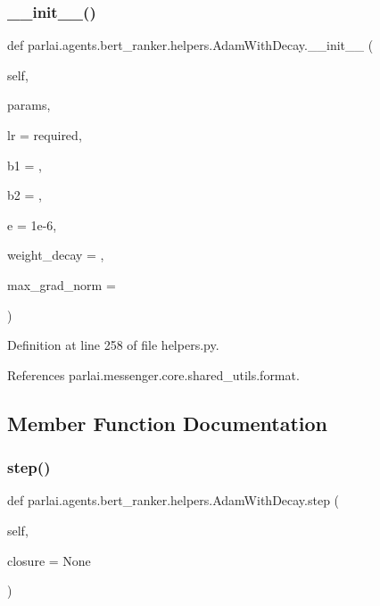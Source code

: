 \subsubsection{\texorpdfstring{\+\_\+\+\_\+init\+\_\+\+\_\+()}{\_\_init\_\_()}}
{\footnotesize\ttfamily def parlai.\+agents.\+bert\+\_\+ranker.\+helpers.\+Adam\+With\+Decay.\+\_\+\+\_\+init\+\_\+\+\_\+ (\begin{DoxyParamCaption}\item[{}]{self,  }\item[{}]{params,  }\item[{}]{lr = {\ttfamily required},  }\item[{}]{b1 = {},  }\item[{}]{b2 = {},  }\item[{}]{e = {\ttfamily 1e-\/6},  }\item[{}]{weight\+\_\+decay = {},  }\item[{}]{max\+\_\+grad\+\_\+norm = {} }\end{DoxyParamCaption})}



Definition at line 258 of file helpers.\+py.



References parlai.\+messenger.\+core.\+shared\+\_\+utils.\+format.



\subsection{Member Function Documentation}
\mbox{\label{classparlai_1_1agents_1_1bert__ranker_1_1helpers_1_1AdamWithDecay_aeb41188377c1a61b4638228abd6c3e64}} 
\subsubsection{\texorpdfstring{step()}{step()}}
{\footnotesize\ttfamily def parlai.\+agents.\+bert\+\_\+ranker.\+helpers.\+Adam\+With\+Decay.\+step (\begin{DoxyParamCaption}\item[{}]{self,  }\item[{}]{closure = {\ttfamily None} }\end{DoxyParamCaption})}

